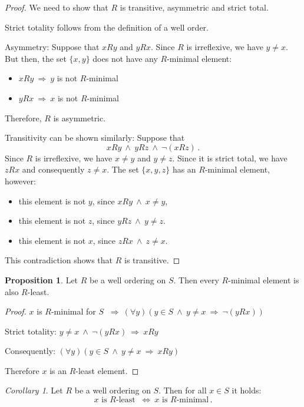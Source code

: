\documentclass[11pt,paper=b5,footinclude,headinclude]{scrbook} %
\def\inn {{~\wedge~}}
\def\sledi {{~\Rightarrow~}}
\def\cee {{~\Leftrightarrow~}}
\theoremstyle{remark}
\newtheorem*{corollary}{Corollary}
\theoremstyle{definition} %
\theoremstyle{theorem} %
\newtheorem*{proposition}{Proposition}
\begin{document}
\begin{proof}
We need to show that $R$ is transitive, asymmetric and strict total.

Strict totality follows from the definition of a well order.

Asymmetry: Suppose that $xRy$ and $yRx$.
Since $R$ is irreflexive, we have $y\neq x$.
But then, the set $\{x,y\}$ does not have any  $R$-minimal element:
\begin{itemize}
  \item $xRy\sledi y$ is not $R$-minimal
  \item $yRx\sledi x$ is not $R$-minimal
\end{itemize}
Therefore, $R$ is asymmetric.

Transitivity can be shown similarly:
Suppose that
$$xRy\inn yRz\inn \neg(xRz)\,.$$
Since $R$ is irreflexive, we have $x\neq y$ and $y\neq z$.
Since it is strict total, we have $zRx$ and consequently $z\neq x$.
The set  $\{x,y,z\}$ has an $R$-minimal element, however:
\begin{itemize}
  \item this element is not $y$, since $xRy \inn x\neq y$,
  \item this element is not $z$, since $yRz \inn y\neq z$.
  \item this element is not $x$, since $zRx \inn z\neq x$.
  \end{itemize}
This contradiction shows that $R$ is transitive.
\end{proof}

\begin{proposition}
Let $R$ be a well ordering on $S$. Then every $R$-minimal element
is also $R$-least.
\end{proposition}

\begin{proof}
$x$ is $R$-minimal for $S$ $\sledi (\forall y)(y\in S\inn y\neq x\sledi \neg (yRx))$

Strict totality: $y\neq x\inn \neg (yRx)\sledi xRy$

Consequently:
$(\forall y)(y\in S\inn y\neq x\sledi xRy)$

Therefore $x$ is an $R$-least element.
\end{proof}

\begin{corollary}
Let $R$ be a well ordering on $S$. Then for all $x\in S$ it holds:
$$x \textrm{ is } R\textrm{-least } \cee x \textrm{ is } R\textrm{-minimal}\,.$$
\end{corollary}
\end{document}
